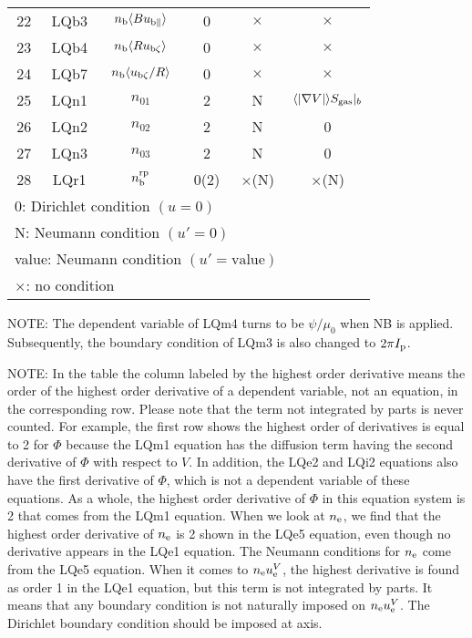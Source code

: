 \documentclass[11pt]{article}
\def\r#1{{\rm#1}}
\def\aves#1{\langle#1\rangle}
\def\para{\parallel}
\def\nee{n_\r{e}}
\def\nb{n_\r{b}}
\def\nna{n_{01}}
\def\nnb{n_{02}}
\def\nnc{n_{03}}
\def\ubzt{u_{\r{b}\zeta}}
\def\ubpara{u_{\r{b}\para}}
\def\ueV{u_\r{e}^V}
\def\nbrp{n_\r{b}^\r{rp}}
\begin{document}
\begin{tabular}{|c|c|c|c|c|c|}
 22   & LQb3 & $\nb\aves{B\ubpara}$ & 0    &  $\times$    & $\times$\\
 23   & LQb4 & $\nb\aves{R\ubzt}$   & 0    &  $\times$    & $\times$\\
 24   & LQb7 & $\nb\aves{\ubzt/R}$  & 0    &  $\times$    & $\times$\\
 25   & LQn1 & $\nna$               & 2    &  N           & $\aves{|\nabla V|}S_\r{gas}|_b$\\
 26   & LQn2 & $\nnb$               & 2    &  N           & 0\\
 27   & LQn3 & $\nnc$               & 2    &  N           & 0\\
 28   & LQr1 & $\nbrp$              & 0(2) &  $\times$(N) & $\times$(N)\\\hline
 \multicolumn{5}{l}{0: Dirichlet condition $(u=0)$}\\
 \multicolumn{5}{l}{N: Neumann condition $(u'=0)$}\\
 \multicolumn{5}{l}{value: Neumann condition $(u'=\mbox{value})$}\\
 \multicolumn{5}{l}{$\times$: no condition}
\end{tabular}
%

\medskip

NOTE: The dependent variable of LQm4 turns to be $\psi/\mu_0$ when NB is
applied. Subsequently, the boundary condition of LQm3 is also changed to
$2\pi I_\r{p}$.

NOTE: In the table the column labeled by the highest order derivative means
the order of the highest order derivative of a dependent variable, not
an equation, in the corresponding row.
Please note that the term not integrated by parts is never counted.
For example, the first row shows the highest order of derivatives is
equal to 2 for $\Phi$ because the LQm1 equation
has the diffusion term having the second derivative of $\Phi$ with
respect to $V$. In addition, the LQe2 and LQi2 equations also have the
first derivative of $\Phi$, which is not a dependent variable of these
equations. As a whole, the highest order derivative of $\Phi$ in this
equation system is 2 that comes from the LQm1 equation.
When we look at $\nee$, we find that the highest order derivative of
$\nee$ is 2 shown in the LQe5 equation, even though no derivative
appears in the LQe1 equation. The Neumann conditions for $\nee$ come
from the LQe5 equation.
When it comes to $\nee\ueV$, the highest derivative is found as order 1
in the LQe1 equation, but this term is not integrated by parts.
It means that any boundary condition is not naturally imposed on
$\nee\ueV$. The Dirichlet boundary condition should be imposed at axis.
\end{document}
